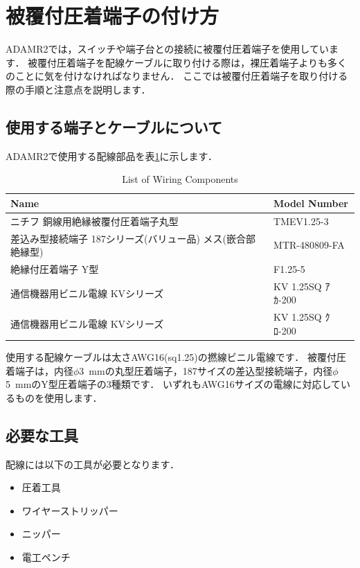 \documentclass[{../../master}]{subfiles}
\begin{document}
\section{被覆付圧着端子の付け方}

ADAMR2では，スイッチや端子台との接続に被覆付圧着端子を使用しています．
被覆付圧着端子を配線ケーブルに取り付ける際は，裸圧着端子よりも多くのことに気を付けなければなりません．
ここでは被覆付圧着端子を取り付ける際の手順と注意点を説明します．

\subsection{使用する端子とケーブルについて}

ADAMR2で使用する配線部品を表\ref{tab:list_of_wiring_components}に示します．

\begin{table}[ht]
  \begin{center}
    \begin{tabular}{|l|l|}
      \hline
      Name & Model Number \\ \hline
      ニチフ 銅線用絶縁被覆付圧着端子丸型 & TMEV1.25-3 \\ \hline
      差込み型接続端子 187シリーズ(バリュー品) メス(嵌合部絶縁型) & MTR-480809-FA \\ \hline
      絶縁付圧着端子 Y型 & F1.25-5 \\ \hline
      通信機器用ビニル電線 KVシリーズ & KV 1.25SQ ｱｶ-200 \\ \hline
      通信機器用ビニル電線 KVシリーズ & KV 1.25SQ ｸﾛ-200 \\ \hline
    \end{tabular}
  \end{center}
  \caption{List of Wiring Components}
  \label{tab:list_of_wiring_components}
\end{table}

使用する配線ケーブルは太さAWG16(sq1.25)の撚線ビニル電線です．
被覆付圧着端子は，内径$\phi$\SI{3}{mm}の丸型圧着端子，187サイズの差込型接続端子，内径$\phi$\SI{5}{mm}のY型圧着端子の3種類です．
いずれもAWG16サイズの電線に対応しているものを使用します．

\subsection{必要な工具}

配線には以下の工具が必要となります．

\begin{itemize}
  \item 圧着工具
  \item ワイヤーストリッパー
  \item ニッパー
  \item 電工ペンチ
\end{itemize}
\end{document}
